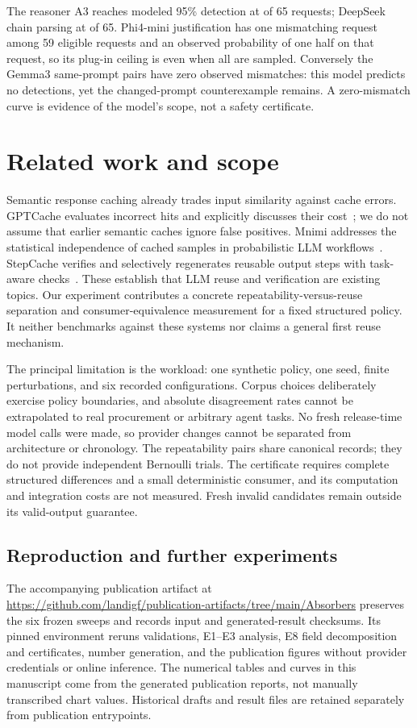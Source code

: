 The reasoner A3 reaches modeled 95\% detection at \absThinkAthreeCanaryK{} of 65 requests; DeepSeek chain parsing at \absChainDsParseCanaryK{} of 65. Phi4-mini justification has one mismatching request among 59 eligible requests and an observed probability of one half on that request, so its plug-in ceiling is \absChainPhJustifyCanaryCeiling{} even when all are sampled. Conversely the Gemma3 same-prompt pairs have zero observed mismatches: this model predicts no detections, yet the changed-prompt counterexample remains. A zero-mismatch curve is evidence of the model's scope, not a safety certificate.

\section{Related work and scope}
Semantic response caching already trades input similarity against cache errors. GPTCache evaluates incorrect hits and explicitly discusses their cost~\cite{gptcache}; we do not assume that earlier semantic caches ignore false positives. Mnimi addresses the statistical independence of cached samples in probabilistic LLM workflows~\cite{mnimi}. StepCache verifies and selectively regenerates reusable output steps with task-aware checks~\cite{stepcache}. These establish that LLM reuse and verification are existing topics. Our experiment contributes a concrete repeatability-versus-reuse separation and consumer-equivalence measurement for a fixed structured policy. It neither benchmarks against these systems nor claims a general first reuse mechanism.

The principal limitation is the workload: one synthetic policy, one seed, finite perturbations, and six recorded configurations. Corpus choices deliberately exercise policy boundaries, and absolute disagreement rates cannot be extrapolated to real procurement or arbitrary agent tasks. No fresh release-time model calls were made, so provider changes cannot be separated from architecture or chronology. The repeatability pairs share canonical records; they do not provide independent Bernoulli trials. The certificate requires complete structured differences and a small deterministic consumer, and its computation and integration costs are not measured. Fresh invalid candidates remain outside its valid-output guarantee.

\iflongversion
\subsection{Reproduction and further experiments}
The accompanying publication artifact at \url{https://github.com/landigf/publication-artifacts/tree/main/Absorbers} preserves the six frozen sweeps and records input and generated-result checksums. Its pinned environment reruns validations, E1--E3 analysis, E8 field decomposition and certificates, number generation, and the publication figures without provider credentials or online inference. The numerical tables and curves in this manuscript come from the generated publication reports, not manually transcribed chart values. Historical drafts and result files are retained separately from publication entrypoints.

